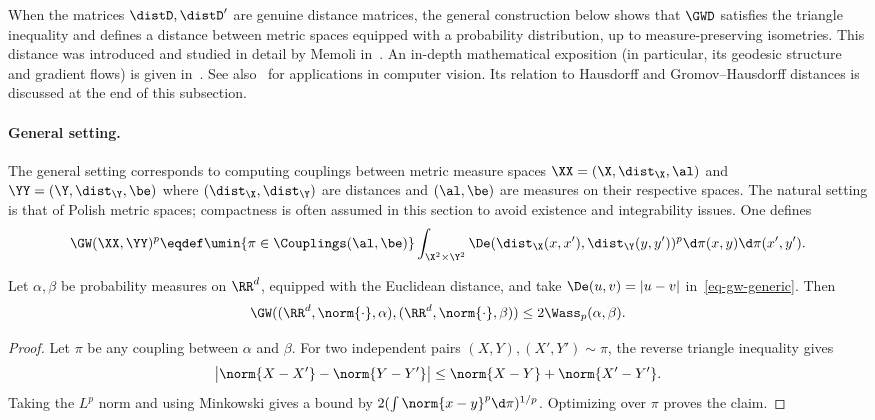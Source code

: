 When the matrices $\distD,\distD'$ are genuine distance matrices, the general construction below shows that $\GWD$ satisfies the triangle inequality and defines a distance between metric spaces equipped with a probability distribution, up to measure-preserving isometries.
%
This distance was introduced and studied in detail by Memoli in~\cite{memoli-2011}. An in-depth mathematical exposition (in particular, its geodesic structure and gradient flows) is given in~\cite{SturmGW}. See also~\cite{schmitzer2013modelling} for applications in computer vision.
%
Its relation to Hausdorff and Gromov--Hausdorff distances is discussed at the end of this subsection.

\paragraph{General setting.}

The general setting corresponds to computing couplings between metric measure spaces $\XX=(\X,\dist_\X,\al)$
	and $\YY=(\Y,\dist_\Y,\be)$ where $(\dist_\X,\dist_\Y)$ are distances and $(\al,\be)$ are measures on their respective spaces.
	The natural setting is that of Polish metric spaces; compactness is often assumed in this section to avoid existence and integrability issues.
	One defines
	\begin{align}
		\label{eq-gw-generic}
		\GW( \XX,\YY )^p \eqdef
		\umin{ \pi \in \Couplings(\al,\be) }
		\int_{\X^2 \times \Y^2}
		 \De(\dist_\X(x,x'),\dist_\Y(y,y'))^p
		\d\pi(x,y)\d\pi(x',y').
	\end{align}

\begin{prop}\label{prop-gw-controlled-by-wasserstein}
	Let $\alpha,\beta$ be probability measures on $\RR^d$, equipped with the Euclidean distance, and take $\De(u,v)=|u-v|$ in~\eqref{eq-gw-generic}. Then
	\[
		\GW((\RR^d,\norm{\cdot},\alpha),(\RR^d,\norm{\cdot},\beta))
		\leq
		2\Wass_p(\alpha,\beta).
	\]
\end{prop}
\begin{proof}
	Let $\pi$ be any coupling between $\alpha$ and $\beta$. For two independent pairs $(X,Y),(X',Y')\sim\pi$, the reverse triangle inequality gives
	\[
		\big|\norm{X-X'}-\norm{Y-Y'}\big|
		\leq
		\norm{X-Y}+\norm{X'-Y'}.
	\]
	Taking the $L^p$ norm and using Minkowski gives a bound by $2(\int\norm{x-y}^p\d\pi)^{1/p}$. Optimizing over $\pi$ proves the claim.
\end{proof}


